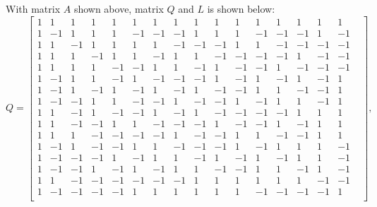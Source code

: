 \documentclass[11pt]{article}
\begin{document}
With matrix $A$ shown above, matrix $Q$ and $L$ is shown below:
$$Q=
\left[\begin{smallmatrix}
    1 & 1 & 1 & 1 & 1 & 1 & 1 & 1 & 1 & 1 & 1 & 1 & 1 & 1 & 1 & 1 &  \\
    1 & -1 & 1 & 1 & 1 & -1 & -1 & -1 & 1 & 1 & 1 & -1 & -1 & -1 & 1 & -1 \\
    1 & 1 & -1 & 1 & 1 & 1 & 1 & -1 & -1 & -1 & 1 & 1 & -1 & -1 & -1 & -1 \\
    1 & 1 & 1 & -1 & 1 & 1 & -1 & 1 & 1 & -1 & -1 & -1 & -1 & 1 & -1 & -1 \\
    1 & 1 & 1 & 1 & -1 & -1 & 1 & 1 & -1 & 1 & -1 & -1 & 1 & -1 & -1 & -1 \\
    1 & -1 & 1 & 1 & -1 & 1 & -1 & -1 & -1 & 1 & -1 & 1 & -1 & 1 & -1 & 1 \\
    1 & -1 & 1 & -1 & 1 & -1 & 1 & -1 & 1 & -1 & -1 & 1 & 1 & -1 & -1 & 1 \\
    1 & -1 & -1 & 1 & 1 & -1 & -1 & 1 & -1 & -1 & 1 & -1 & 1 & 1 & -1 & 1 \\
    1 & 1 & -1 & 1 & -1 & -1 & 1 & -1 & 1 & -1 & -1 & -1 & -1 & 1 & 1 & 1 \\
    1 & 1 & -1 & -1 & 1 & 1 & -1 & -1 & -1 & 1 & -1 & -1 & 1 & -1 & 1 & 1 \\
    1 & 1 & 1 & -1 & -1 & -1 & -1 & 1 & -1 & -1 & 1 & 1 & -1 & -1 & 1 & 1 \\
    1 & -1 & 1 & -1 & -1 & 1 & 1 & -1 & -1 & -1 & 1 & -1 & 1 & 1 & 1 & -1 \\
    1 & -1 & -1 & -1 & 1 & -1 & 1 & 1 & -1 & 1 & -1 & 1 & -1 & 1 & 1 & -1 \\
    1 & -1 & -1 & 1 & -1 & 1 & -1 & 1 & 1 & -1 & -1 & 1 & 1 & -1 & 1 & -1 \\
    1 & 1 & -1 & -1 & -1 & -1 & -1 & -1 & 1 & 1 & 1 & 1 & 1 & 1 & -1 & -1 \\
    1 & -1 & -1 & -1 & -1 & 1 & 1 & 1 & 1 & 1 & 1 & -1 & -1 & -1 & -1 & 1 \\
\end{smallmatrix}\right],
$$
\end{document}
